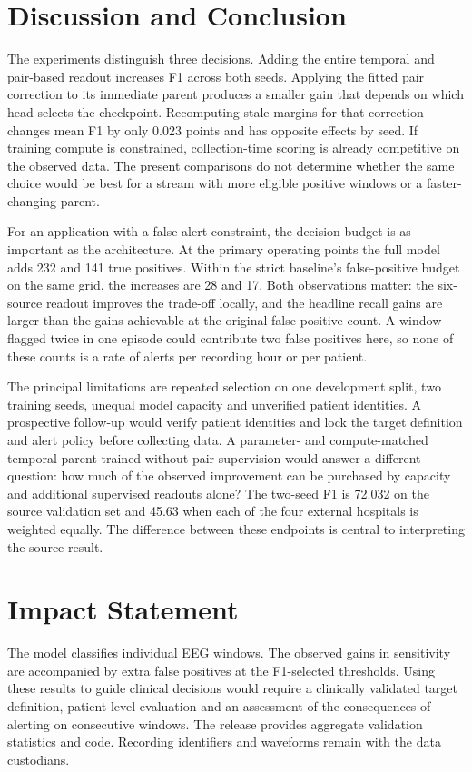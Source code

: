 \documentclass{article}
\begin{document}
\section{Discussion and Conclusion}
The experiments distinguish three decisions. Adding the entire temporal and pair-based readout increases F1 across both seeds. Applying the fitted pair correction to its immediate parent produces a smaller gain that depends on which head selects the checkpoint. Recomputing stale margins for that correction changes mean F1 by only 0.023 points and has opposite effects by seed. If training compute is constrained, collection-time scoring is already competitive on the observed data. The present comparisons do not determine whether the same choice would be best for a stream with more eligible positive windows or a faster-changing parent.

For an application with a false-alert constraint, the decision budget is as important as the architecture. At the primary operating points the full model adds 232 and 141 true positives. Within the strict baseline's false-positive budget on the same grid, the increases are 28 and 17. Both observations matter: the six-source readout improves the trade-off locally, and the headline recall gains are larger than the gains achievable at the original false-positive count. A window flagged twice in one episode could contribute two false positives here, so none of these counts is a rate of alerts per recording hour or per patient.

The principal limitations are repeated selection on one development split, two training seeds, unequal model capacity and unverified patient identities. A prospective follow-up would verify patient identities and lock the target definition and alert policy before collecting data. A parameter- and compute-matched temporal parent trained without pair supervision would answer a different question: how much of the observed improvement can be purchased by capacity and additional supervised readouts alone? The two-seed F1 is 72.032 on the source validation set and 45.63 when each of the four external hospitals is weighted equally. The difference between these endpoints is central to interpreting the source result.

\clearpage
\section*{Impact Statement}
The model classifies individual EEG windows. The observed gains in sensitivity are accompanied by extra false positives at the F1-selected thresholds. Using these results to guide clinical decisions would require a clinically validated target definition, patient-level evaluation and an assessment of the consequences of alerting on consecutive windows. The release provides aggregate validation statistics and code. Recording identifiers and waveforms remain with the data custodians.
\end{document}
